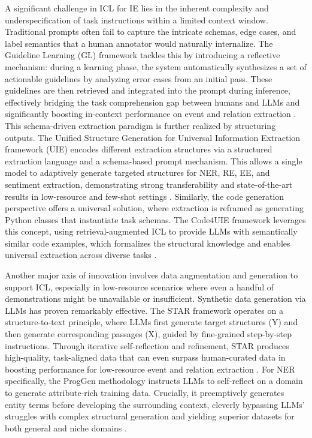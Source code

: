 \documentclass[11pt]{article}
\begin{document}
A significant challenge in ICL for IE lies in the inherent complexity and underspecification of task instructions within a limited context window. Traditional prompts often fail to capture the intricate schemas, edge cases, and label semantics that a human annotator would naturally internalize. The Guideline Learning (GL) framework tackles this by introducing a reflective mechanism: during a learning phase, the system automatically synthesizes a set of actionable guidelines by analyzing error cases from an initial pass. These guidelines are then retrieved and integrated into the prompt during inference, effectively bridging the task comprehension gap between humans and LLMs and significantly boosting in-context performance on event and relation extraction \cite{ref502}. This schema-driven extraction paradigm is further realized by structuring outputs. The Unified Structure Generation for Universal Information Extraction framework (UIE) encodes different extraction structures via a structured extraction language and a schema-based prompt mechanism. This allows a single model to adaptively generate targeted structures for NER, RE, EE, and sentiment extraction, demonstrating strong transferability and state-of-the-art results in low-resource and few-shot settings \cite{ref503}. Similarly, the code generation perspective offers a universal solution, where extraction is reframed as generating Python classes that instantiate task schemas. The Code4UIE framework leverages this concept, using retrieval-augmented ICL to provide LLMs with semantically similar code examples, which formalizes the structural knowledge and enables universal extraction across diverse tasks \cite{ref504}.

Another major axis of innovation involves data augmentation and generation to support ICL, especially in low-resource scenarios where even a handful of demonstrations might be unavailable or insufficient. Synthetic data generation via LLMs has proven remarkably effective. The STAR framework operates on a structure-to-text principle, where LLMs first generate target structures (Y) and then generate corresponding passages (X), guided by fine-grained step-by-step instructions. Through iterative self-reflection and refinement, STAR produces high-quality, task-aligned data that can even surpass human-curated data in boosting performance for low-resource event and relation extraction \cite{ref505}. For NER specifically, the ProgGen methodology instructs LLMs to self-reflect on a domain to generate attribute-rich training data. Crucially, it preemptively generates entity terms before developing the surrounding context, cleverly bypassing LLMs' struggles with complex structural generation and yielding superior datasets for both general and niche domains \cite{ref506}.
\end{document}
